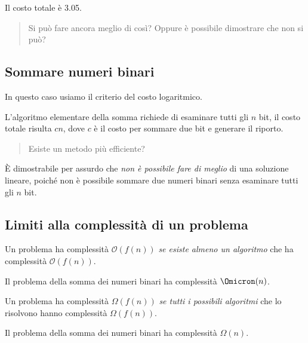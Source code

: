 Il costo totale è \num{3.05}.

\begin{quote}
Si può fare ancora meglio di così?
Oppure è possibile dimostrare che non si può?
\end{quote}

\clearpage
\subsection{Sommare numeri binari}

\begin{note}
In questo caso usiamo il criterio del costo logaritmico.
\end{note}

L'algoritmo elementare della somma richiede di esaminare tutti gli \(n\) bit, il costo totale risulta \(cn\), dove \(c\) è il costo per sommare due bit e generare il riporto.

\begin{quote}
Esiste un metodo più efficiente?
\end{quote}

\`{E} dimostrabile per assurdo che \emph{non è possibile fare di meglio} di una soluzione lineare, poiché non è possibile sommare due numeri binari senza esaminare tutti gli \(n\) bit.

\subsection*{Limiti alla complessità di un problema}

\begin{definition}
Un problema ha complessità \(\mathcal{O}(f(n))\) \emph{se esiste almeno un algoritmo} che ha complessità \(\mathcal{O}(f(n))\).
\end{definition}

\begin{note}
Il problema della somma dei numeri binari ha complessità \(\Omicron(n)\).
\end{note}

\begin{definition}
Un problema ha complessità \(\Omega(f(n))\) \emph{se tutti i possibili algoritmi} che lo risolvono hanno complessità \(\Omega(f(n))\).
\end{definition}

\begin{note}
Il problema della somma dei numeri binari ha complessità \(\Omega(n)\).
\end{note}

